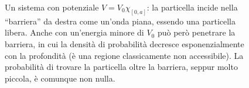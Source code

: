 \begin{figure}
	\centering
	\caption{Un sistema con potenziale $V=V_0\chi_{[0,a]}$: la particella incide nella ``barriera'' da destra come un'onda piana, essendo una particella libera. Anche con un'energia minore di $V_0$ può però penetrare la barriera, in cui la densità di probabilità decresce esponenzialmente con la profondità (è una regione classicamente non accessibile). La probabilità di trovare la particella oltre la barriera, seppur molto piccola, è comunque non nulla.}
	\label{fig:tunneling}
\end{figure}
